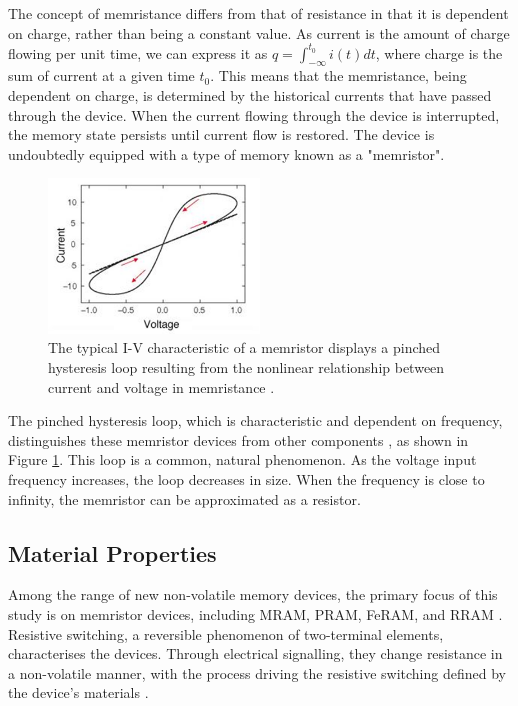 \noindent The concept of memristance differs from that of resistance in that it is dependent on charge, rather than being a constant value.  As current is the amount of charge flowing per unit time, we can express it as $q = \int_{-\infty}^{t_0} i(t)dt$, where charge is the sum of current at a given time $t_0$. This means that the memristance, being dependent on charge, is determined by the historical currents that have passed through the device. When the current flowing through the device is interrupted, the memory state persists until current flow is restored. The device is undoubtedly equipped with a type of memory known as a "memristor". \\

\begin{figure}[htbp!] 
\centering    
\includegraphics[width=0.5\textwidth]{Chapter1/Figs/1b.png}
\caption[Typical I-V characteristic of a memristor]{The typical I-V characteristic  of a memristor displays a pinched hysteresis loop resulting from the nonlinear relationship between current and voltage in memristance \cite{wen2012dynamics}.}
\label{fig:1b}
\end{figure}

\noindent The pinched hysteresis loop, which is characteristic and dependent on frequency, distinguishes these memristor devices from other components \cite{chua2019resistance}, as shown in Figure \ref{fig:1b}.  This loop is a common, natural phenomenon. As the voltage input frequency increases, the loop decreases in size. When the frequency is close to infinity, the memristor can be approximated as a resistor.

\subsection[Material Properties]{Material Properties}

Among the range of new non-volatile memory devices, the primary focus of this study is on memristor devices, including MRAM, PRAM, FeRAM, and RRAM \cite{wang2017memristors}. Resistive switching, a reversible phenomenon of two-terminal elements, characterises the devices. Through electrical signalling, they change resistance in a non-volatile manner, with the process driving the resistive switching defined by the device's materials \cite{mehonic2018silicon}. \\

